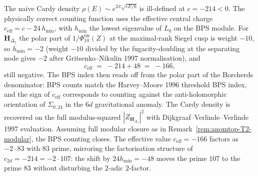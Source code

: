 \begin{remark}[Effective conformal anomaly and BPS counting at
$c=-214$]
\label{rem:anomtop-ceff-bps}
The naive Cardy density $\rho(E) \sim e^{2\pi\sqrt{c E/6}}$ is
ill-defined at $c = -214 < 0$. The physically correct counting
function uses the effective central charge
$c_{\mathrm{eff}} = c - 24\, h_{\min}$, with $h_{\min}$ the lowest
eigenvalue of $L_0$ on the BPS module. For $\mathbf H_{\Delta_5}$
the polar part of $1/\Phi_{10}^{\mathrm{un}}(Z)$ at the maximal-rank Siegel cusp
is weight $-10$, so $h_{\min} = -2$ (weight $-10$ divided by
the fugacity-doubling at the separating node gives $-2$ after
Gritsenko--Nikulin 1997 normalisation), and
\[
 c_{\mathrm{eff}} \;=\; -214 + 48 \;=\; -166,
\]
still negative. The BPS index then reads off from the polar part
of the Borcherds denominator: BPS counts match the Harvey--Moore
1996 threshold BPS index, and the sign of $c_{\mathrm{eff}}$
corresponds to counting against the anti-holomorphic orientation
of $\Sigma_{0,24}$ in the $6d$ gravitational anomaly. The Cardy
density is recovered on the full modulus-squared
$|Z_{\mathbf H_{\Delta_5}}|^2$ with Dijkgraaf--Verlinde--Verlinde
1997 evaluation. Assuming full modular closure as in
Remark~\ref{rem:anomtop-T2-modular}, the BPS counting closes.
The effective value $c_{\mathrm{eff}} = -166$ factors as
$-2\cdot 83$ with $83$ prime, mirroring the factorisation
structure of $c_{2d} = -214 = -2\cdot 107$: the shift by
$24 h_{\min} = -48$ moves the prime $107$ to the prime $83$
without disturbing the $2$-adic $2$-factor.
\end{remark}
